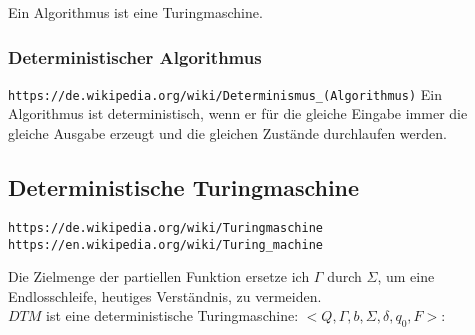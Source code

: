 \documentclass[10pt,a4paper]{article}
\begin{document}
Ein Algorithmus ist eine Turingmaschine.

\subsubsection {Deterministischer Algorithmus}

\verb+https://de.wikipedia.org/wiki/Determinismus_(Algorithmus)+
\vskip 8pt
Ein Algorithmus ist deterministisch, wenn er für die gleiche Eingabe immer die
gleiche Ausgabe erzeugt und die gleichen Zustände durchlaufen werden.

\subsection {Deterministische Turingmaschine}

\verb+https://de.wikipedia.org/wiki/Turingmaschine+ \\
\verb+https://en.wikipedia.org/wiki/Turing_machine+
\vskip 8pt

Die Zielmenge der partiellen Funktion ersetze ich $\Gamma$ durch $\Sigma$,
um eine Endlosschleife, heutiges Verständnis, zu vermeiden. \\

\noindent
$DTM$ ist eine deterministische Turingmaschine: $<Q, \Gamma, b, \Sigma, \delta, q_0, F >$:
\end{document}
